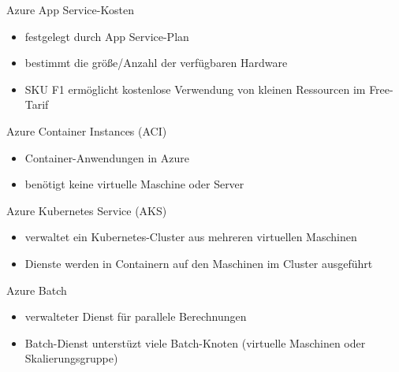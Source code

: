 \begin{flashcard}[\ ]{Azure App Service-Kosten}
    \begin{itemize}
        \item festgelegt durch App Service-Plan
        \item bestimmt die größe/Anzahl der verfügbaren Hardware
        \item SKU F1 ermöglicht kostenlose Verwendung von kleinen Ressourcen im Free-Tarif
    \end{itemize}

\end{flashcard}

\begin{flashcard}[Definition]{Azure Container Instances (ACI)}
    \begin{itemize}
        \item Container-Anwendungen in Azure
        \item benötigt keine virtuelle Maschine oder Server
    \end{itemize}

\end{flashcard}

\begin{flashcard}[Definition]{Azure Kubernetes Service (AKS)}
    \begin{itemize}
        \item verwaltet ein Kubernetes-Cluster aus mehreren virtuellen Maschinen
        \item Dienste werden in Containern auf den Maschinen im Cluster ausgeführt
    \end{itemize}

\end{flashcard}

\begin{flashcard}[Definition]{Azure Batch}
    \begin{itemize}
        \item verwalteter Dienst für parallele Berechnungen
        \item Batch-Dienst unterstüzt viele Batch-Knoten (virtuelle Maschinen oder Skalierungsgruppe)
    \end{itemize}
\end{flashcard}

